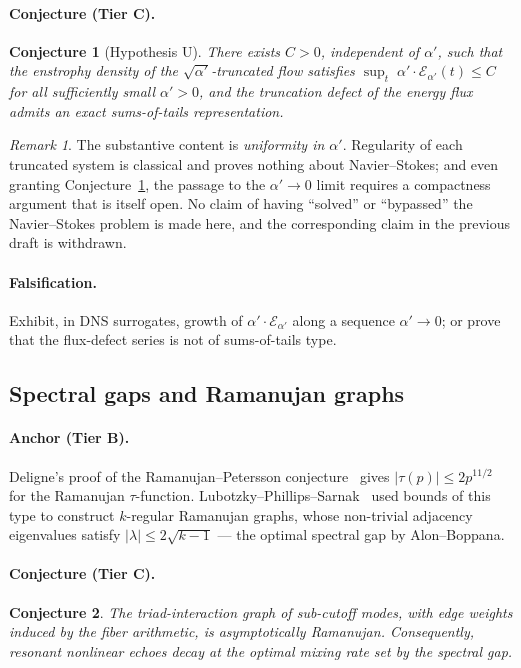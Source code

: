 \documentclass[11pt,a4paper]{article}
\theoremstyle{plain}
\newtheorem{conjecture}{Conjecture}
\theoremstyle{definition}
\theoremstyle{remark}
\newtheorem{remark}{Remark}
\newcommand{\tierB}{\textbf{Tier B}}
\newcommand{\tierC}{\textbf{Tier C}}
\begin{document}
\paragraph{Conjecture (\tierC{}).}
\begin{conjecture}[Hypothesis U]\label{conj:U}
There exists $C>0$, independent of $\alpha'$, such that the enstrophy
density of the $\sqrt{\alpha'}$-truncated flow satisfies
$\sup_{t}\;\alpha'\!\cdot\!\mathcal{E}_{\alpha'}(t)\le C$ for all
sufficiently small $\alpha'>0$, and the truncation defect of the energy flux
admits an exact sums-of-tails representation.
\end{conjecture}

\begin{remark}
The substantive content is \emph{uniformity in $\alpha'$}. Regularity of
each truncated system is classical and proves nothing about Navier--Stokes;
and even granting Conjecture~\ref{conj:U}, the passage to the
$\alpha'\to 0$ limit requires a compactness argument that is itself open.
No claim of having ``solved'' or ``bypassed'' the Navier--Stokes problem is
made here, and the corresponding claim in the previous draft is withdrawn.
\end{remark}

\paragraph{Falsification.} Exhibit, in DNS surrogates, growth of
$\alpha'\cdot\mathcal{E}_{\alpha'}$ along a sequence $\alpha'\to 0$; or
prove that the flux-defect series is not of sums-of-tails type.

\subsection{Spectral gaps and Ramanujan graphs}\label{sec:gap}

\paragraph{Anchor (\tierB{}).} Deligne's proof of the Ramanujan--Petersson
conjecture~\cite{Deligne1974} gives $|\tau(p)|\le 2p^{11/2}$ for the
Ramanujan $\tau$-function. Lubotzky--Phillips--Sarnak~\cite{LPS1988} used
bounds of this type to construct $k$-regular Ramanujan graphs, whose
non-trivial adjacency eigenvalues satisfy $|\lambda|\le 2\sqrt{k-1}$ --- the
optimal spectral gap by Alon--Boppana.

\paragraph{Conjecture (\tierC{}).}
\begin{conjecture}\label{conj:gap}
The triad-interaction graph of sub-cutoff modes, with edge weights induced
by the fiber arithmetic, is asymptotically Ramanujan. Consequently,
resonant nonlinear echoes decay at the optimal mixing rate set by the
spectral gap.
\end{conjecture}
\end{document}
